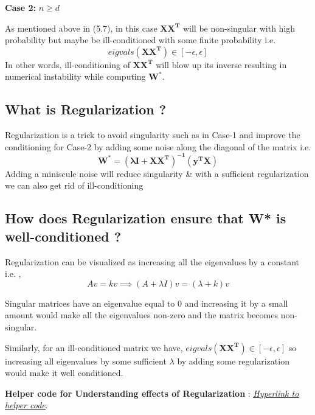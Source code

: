 \documentclass[11pt]{article}
\begin{document}
\textbf{Case 2:} ${n \geq d}$

As mentioned above in (5.7), in this case ${\mathbf{X X^T}}$ will be non-singular with high probability but maybe be ill-conditioned with some finite probability i.e.
        $${eigvals(\mathbf{X X^T}) \in [-\epsilon,\epsilon]}$$
In other words, ill-conditioning of ${\mathbf{X X^T}}$ will blow up its inverse resulting in numerical instability while computing ${\mathbf{W^*}}$.

\subsection{What is Regularization ?}
Regularization is a trick to avoid singularity such as in Case-1 and improve the conditioning for Case-2 by adding some noise along the diagonal of the matrix i.e.
$${\mathbf{W^* = (\lambda I + X X^T)^{-1}(y^T X)}}$$
Adding a miniscule noise will reduce singularity & with a sufficient regularization we can also get rid of ill-conditioning

\subsection{How does Regularization ensure that \textbf{W*} is well-conditioned ?}
Regularization can be visualized as increasing all the eigenvalues by a constant i.e. ,
\begin{equation}
    Av = kv \implies (A + \lambda I)v = (\lambda + k)v
\end{equation}

Singular matrices have an eigenvalue equal to 0 and increasing it by a small amount would make all the eigenvalues non-zero and  the matrix becomes non-singular.

Similarly, for an ill-conditioned matrix we have, ${eigvals(\mathbf{X X^T}) \in [-\epsilon,\epsilon]}$ so increasing all eigenvalues by some sufficient ${\lambda}$ by adding some regularization would make it well conditioned.


\textbf{Helper code for Understanding effects of Regularization} : \href{https://colab.research.google.com/drive/1BQGdsfARX5V030_1HJgdRMTezbz7ZbDp?usp=sharing}{\underline{\textit{Hyperlink to helper code}}}.
\end{document}
